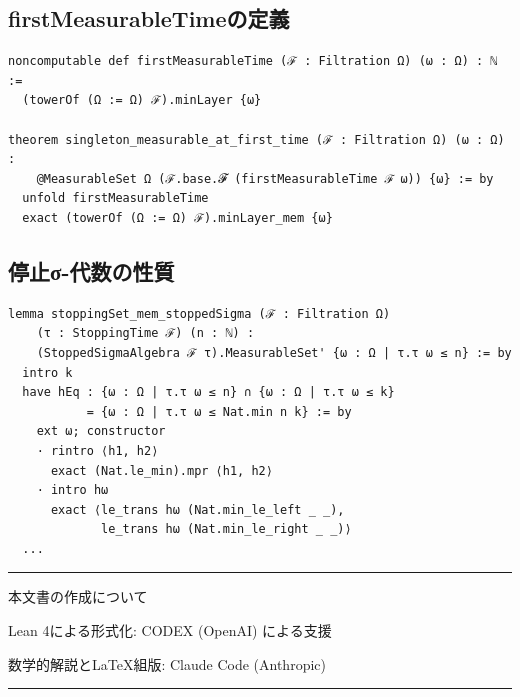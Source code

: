\documentclass[a4paper,12pt]{ltjsarticle}
\theoremstyle{definition}
\begin{document}
\subsection{firstMeasurableTimeの定義}

\begin{verbatim}
noncomputable def firstMeasurableTime (ℱ : Filtration Ω) (ω : Ω) : ℕ :=
  (towerOf (Ω := Ω) ℱ).minLayer {ω}

theorem singleton_measurable_at_first_time (ℱ : Filtration Ω) (ω : Ω) :
    @MeasurableSet Ω (ℱ.base.𝓕 (firstMeasurableTime ℱ ω)) {ω} := by
  unfold firstMeasurableTime
  exact (towerOf (Ω := Ω) ℱ).minLayer_mem {ω}
\end{verbatim}

\subsection{停止σ-代数の性質}

\begin{verbatim}
lemma stoppingSet_mem_stoppedSigma (ℱ : Filtration Ω)
    (τ : StoppingTime ℱ) (n : ℕ) :
    (StoppedSigmaAlgebra ℱ τ).MeasurableSet' {ω : Ω | τ.τ ω ≤ n} := by
  intro k
  have hEq : {ω : Ω | τ.τ ω ≤ n} ∩ {ω : Ω | τ.τ ω ≤ k}
           = {ω : Ω | τ.τ ω ≤ Nat.min n k} := by
    ext ω; constructor
    · rintro ⟨h1, h2⟩
      exact (Nat.le_min).mpr ⟨h1, h2⟩
    · intro hω
      exact ⟨le_trans hω (Nat.min_le_left _ _),
             le_trans hω (Nat.min_le_right _ _)⟩
  ...
\end{verbatim}

\vspace{2em}

\begin{center}
\rule{0.8\textwidth}{0.4pt}

\vspace{1em}

{\large 本文書の作成について}

\vspace{0.5em}

Lean 4による形式化: CODEX (OpenAI) による支援

数学的解説とLaTeX組版: Claude Code (Anthropic)

\vspace{0.5em}

\rule{0.8\textwidth}{0.4pt}
\end{center}
\end{document}

